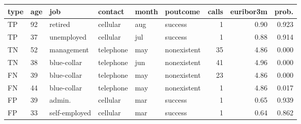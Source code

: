 \begin{tabular}{llllllrrr}
\toprule
type & age & job & contact & month & poutcome & calls & euribor3m & prob. \\
\midrule
TP & 92 & retired & cellular & aug & success & 1 & 0.90 & 0.923 \\
TP & 37 & unemployed & cellular & jul & success & 1 & 0.88 & 0.914 \\
TN & 52 & management & telephone & may & nonexistent & 35 & 4.86 & 0.000 \\
TN & 38 & blue-collar & telephone & jun & nonexistent & 41 & 4.96 & 0.000 \\
FN & 39 & blue-collar & telephone & may & nonexistent & 23 & 4.86 & 0.000 \\
FN & 44 & blue-collar & telephone & may & nonexistent & 1 & 4.86 & 0.017 \\
FP & 39 & admin. & cellular & mar & success & 1 & 0.65 & 0.939 \\
FP & 33 & self-employed & cellular & mar & success & 1 & 0.64 & 0.862 \\
\bottomrule
\end{tabular}